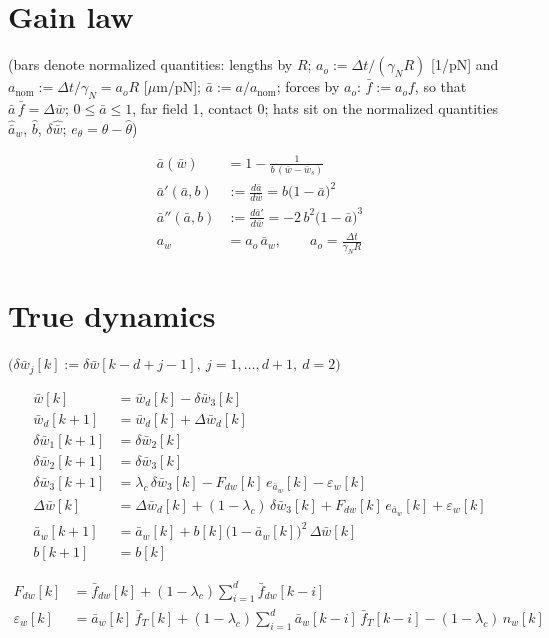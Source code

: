 \documentclass[11pt,a4paper,fontset=none]{ctexart}
\newcommand{\ba}{\bar{a}}
\newcommand{\bw}{\bar{w}}
\newcommand{\dW}{\Delta\bw}
\newcommand{\ap}{\ba'}
\newcommand{\app}{\ba''}
\newcommand{\ah}{\hat{\ba}_w}
\newcommand{\bh}{\hat{b}}
\begin{document}
\section{Gain law}

(bars denote normalized quantities: lengths by $R$; $a_o := \Delta t/(\gamma_N R)$ [1/pN] and $a_{\mathrm{nom}} := \Delta t/\gamma_N = a_o R$ [$\mu$m/pN];
$\ba := a/a_{\mathrm{nom}}$; forces by $a_o$: $\bar f := a_o f$, so that $\ba\,\bar f = \dW$; $0 \le \ba \le 1$, far field 1, contact 0;
hats sit on the normalized quantities $\ah$, $\bh$, $\delta\hat{\bw}$; $e_\theta = \theta - \hat\theta$)

\begin{align*}
\ba(\bw)      &= 1 - \frac{1}{b\,(\bw - \bw_s)} \\
\ap(\ba, b)   &:= \frac{d\ba}{d\bw} = b\bigl(1-\ba\bigr)^{2} \\
\app(\ba, b)  &:= \frac{d\ap}{d\bw} = -2\,b^{2}\bigl(1-\ba\bigr)^{3} \\
a_w &= a_o\,\ba_w , \qquad a_o = \frac{\Delta t}{\gamma_N R}
\end{align*}

\section{True dynamics}

$\bigl(\delta\bw_j[k] := \delta\bw[k-d+j-1],\ j = 1,\dots,d+1,\ d = 2\bigr)$

\begin{align*}
\bw[k]           &= \bw_d[k] - \delta\bw_3[k] \\
\bw_d[k+1]       &= \bw_d[k] + \Delta\bw_d[k] \\
\delta\bw_1[k+1] &= \delta\bw_2[k] \\
\delta\bw_2[k+1] &= \delta\bw_3[k] \\
\delta\bw_3[k+1] &= \lambda_c\,\delta\bw_3[k] - F_{dw}[k]\,e_{\ba_w}[k] - \varepsilon_w[k] \\
\dW[k]           &= \Delta\bw_d[k] + (1-\lambda_c)\,\delta\bw_3[k] + F_{dw}[k]\,e_{\ba_w}[k] + \varepsilon_w[k] \\
\ba_w[k+1]       &= \ba_w[k] + b[k]\bigl(1-\ba_w[k]\bigr)^{2}\,\dW[k] \\
b[k+1]           &= b[k]
\end{align*}

\begin{align*}
F_{dw}[k]        &= \bar f_{dw}[k] + (1-\lambda_c)\sum_{i=1}^{d}\bar f_{dw}[k-i] \\
\varepsilon_w[k] &= \ba_w[k]\,\bar f_T[k] + (1-\lambda_c)\sum_{i=1}^{d}\ba_w[k-i]\,\bar f_T[k-i] - (1-\lambda_c)\,n_w[k]
\end{align*}
\end{document}
